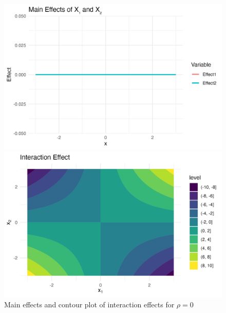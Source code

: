 \begin{figure}[htpb]
    \centering
    \begin{minipage}[t]{0.49\textwidth}
        \centering
        \includegraphics[width=\textwidth]{images/interaction_a1p00_a2p00_a11p00_a22p00_a12p10_rhop00_main.png}
    \end{minipage}%
    \hfill
    \begin{minipage}[t]{0.49\textwidth}
        \centering
        \includegraphics[width=\textwidth]{images/interaction_a1p00_a2p00_a11p00_a22p00_a12p10_rhop00_interaction.png}
    \end{minipage}
    \caption{Main effects and contour plot of interaction effects for $\rho = 0$}
    \label{fig:interaction_rho_0}
\end{figure}

